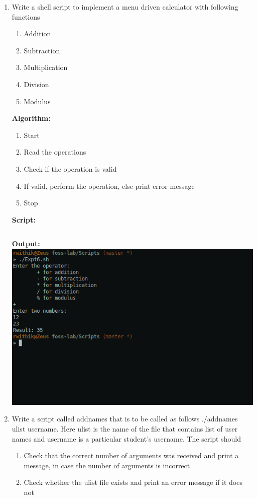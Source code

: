 \documentclass[10pt,a4paper,titlepage]{report}
\begin{document}
\begin{enumerate}
\pagebreak
\item Write a shell script to implement a menu driven calculator with following functions
\begin{enumerate}
\item Addition
\item Subtraction
\item Multiplication
\item Division
\item Modulus
\end{enumerate}
\textbf{Algorithm:}
\begin{enumerate}
	\item Start
	\item Read the operations
	\item Check if the operation is valid
	\item If valid, perform the operation, else print error message
	\item Stop
\end{enumerate}
\textbf{Script:}\newline
\inputminted{bash}{../Scripts/Set1/Expt6.sh}
\textbf{Output:}\newline
\includegraphics[width=\linewidth]{../Images/Shell1/3.png}
\pagebreak
\item Write a script called addnames that is to be called as follows ./addnames ulist username. Here ulist is the name of the file that contains list of user names and username is a particular student's username. The script should
\begin{enumerate}
\item Check that the correct number of arguments was received and print a message, in case the	number of arguments is incorrect
\item Check whether the ulist file exists and print an error message if it does not

\end{enumerate}
\end{enumerate}
\end{document}
